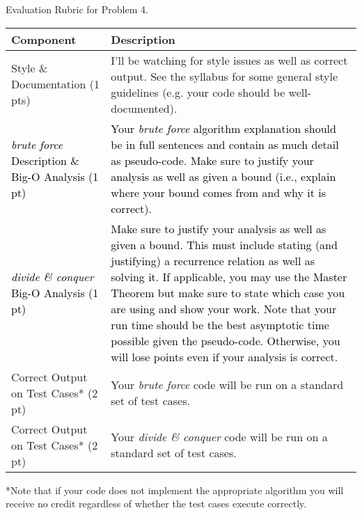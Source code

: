 \documentclass[11pt,answers]{exam}
\begin{document}
Evaluation Rubric for Problem 4.
\begin{center}
  \begin{tabular}{| p{7cm} | p{10cm} |}
	\hline
	Component & Description 	\\
    \hline
    Style \& Documentation  (1 pts) & I'll be watching for style issues as well as correct output.  See the syllabus for some general style guidelines (e.g. your code should be well-documented).  \\ \hline
	\textcolor{black}{\emph{brute force} Description \& Big-O Analysis (1 pt)} & \textcolor{black}{Your \emph{brute force} algorithm explanation should be in full sentences and contain as much detail as pseudo-code.  Make sure to justify your analysis as well as given a bound (i.e., explain where your bound comes from and why it is correct).}\\ \hline
	\textcolor{black}{\emph{divide \& conquer} Big-O Analysis (1 pt)} & \textcolor{black}{Make sure to justify your analysis as well as given a bound.  This must include stating (and justifying) a recurrence relation as well as solving it.  If applicable, you may use the Master Theorem but make sure to state which case you are using and show your work.  Note that your run time should be the best asymptotic time possible given the pseudo-code.  Otherwise, you will lose points even if your analysis is correct.}\\ \hline
 Correct Output on Test Cases* (2 pt) & Your \emph{brute force} code will be run on a standard set of test cases. \\ \hline
	Correct Output on Test Cases* (2 pt) & Your \emph{divide \& conquer} code will be run on a standard set of test cases.\\ \hline
  \end{tabular}
\end{center}
*Note that if your code does not implement the appropriate algorithm you will receive no credit regardless of whether the test cases execute correctly.
\end{document}
